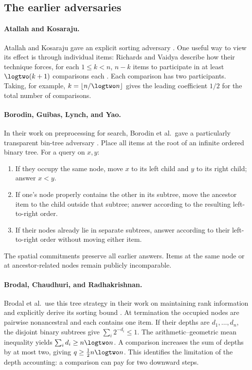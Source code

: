 \subsection{The earlier adversaries}

\paragraph{Atallah and Kosaraju.}
Atallah and Kosaraju gave an explicit sorting adversary
\citep{AtallahKosaraju1981}. One useful way to view its effect is through
individual items: Richards and Vaidya describe how their technique forces,
for each $1\leq k<n$, $n-k$ items to participate in at least
$\logtwo(k+1)$ comparisons each \citep[Section~2]{RichardsVaidya1988}.
Each comparison has two participants. Taking, for example,
$k=\lfloor n/\logtwo n\rfloor$ gives the leading coefficient $1/2$ for
the total number of comparisons.

\paragraph{Borodin, Guibas, Lynch, and Yao.}
In their work on preprocessing for search, Borodin et al.\ gave a particularly
transparent bin-tree adversary \citep[Section~4]{BorodinEtAl1981}. Place all
items at the root of an infinite ordered binary tree. For a query on $x,y$:
\begin{enumerate}[label=(\roman*)]
\item If they occupy the same node, move $x$ to its left child and $y$ to
its right child; answer $x<y$.
\item If one's node properly contains the other in its subtree, move the
ancestor item to the child outside that subtree; answer according to the
resulting left-to-right order.
\item If their nodes already lie in separate subtrees, answer according to
their left-to-right order without moving either item.
\end{enumerate}
The spatial commitments preserve all earlier answers. Items at the same node
or at ancestor-related nodes remain publicly incomparable.

\paragraph{Brodal, Chaudhuri, and Radhakrishnan.}
Brodal et al.\ use this tree strategy in their work on maintaining rank
information and explicitly derive its sorting bound
\citep[Sections~4--4.1]{BrodalEtAl1996}. At termination the occupied nodes
are pairwise nonancestral and each contains one item. If their depths are
$d_1,\ldots,d_n$, the disjoint binary subtrees give
$\sum_i2^{-d_i}\leq1$. The arithmetic--geometric mean inequality yields
$\sum_i d_i\geq n\logtwo n$. A comparison increases the sum of depths by
at most two, giving $q\geq\frac12 n\logtwo n$.
This identifies the limitation of the depth accounting: a comparison can pay
for two downward steps.

